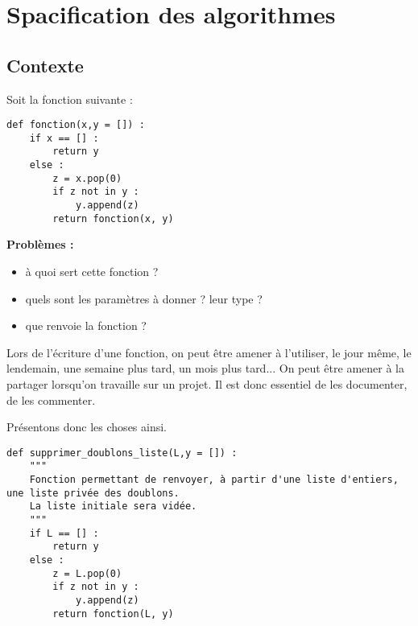 \setchapterpreamble[u]{\margintoc}

\chapter{Spacification des algorithmes}





\section{Contexte}
Soit la fonction suivante : 
\begin{lstlisting}
def fonction(x,y = []) :
    if x == [] : 
        return y
    else : 
        z = x.pop(0)
        if z not in y : 
            y.append(z)
        return fonction(x, y)
\end{lstlisting}

\textbf{Problèmes :}
\begin{itemize}
\item à quoi sert cette fonction ?
\item quels sont les paramètres à donner ? leur type ?
\item que renvoie la fonction ?
\end{itemize}

Lors de l'écriture d'une fonction, on peut être amener à l'utiliser, le jour même, le lendemain, une semaine plus tard, un mois plus tard... On peut être amener à la partager lorsqu'on travaille sur un projet. 
Il est donc essentiel de les documenter, de les commenter.

Présentons donc les choses ainsi. 

\begin{lstlisting}
def supprimer_doublons_liste(L,y = []) :
    """
    Fonction permettant de renvoyer, à partir d'une liste d'entiers, une liste privée des doublons. 
    La liste initiale sera vidée. 
    """
    if L == [] : 
        return y
    else : 
        z = L.pop(0)
        if z not in y : 
            y.append(z)
        return fonction(L, y)
\end{lstlisting}

